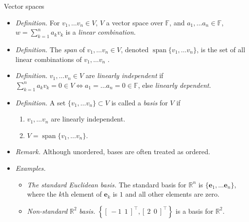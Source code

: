 \documentclass{beamer}
\numberwithin{equation}{section}
\begin{document}
\begin{frame}{Vector spaces}
    \begin{itemize}
        \item
        \textit{Definition.} For $ v_1, \ldots v_n \in V $, $ V $ a vector
        space over $ \mathbb{F} $, and $ a_1, \ldots a_n \in \mathbb{F} $,
        $ w = \sum_{k = 1}^na_kv_k $ is a \textit{linear combination}.

        \item
        \textit{Definition.} The \textit{span} of $ v_1, \ldots v_n \in V $,
        denoted $ \operatorname{span}\{v_1, \ldots v_n\} $, is the set of all
        linear combinations of $ v_1, \ldots v_n $ \cite{jacob_linalg}.

        \item
        \textit{Definition.} $ v_1, \ldots v_n \in V $ are \textit{linearly
        independent} if $ \sum_{k = 1}^na_kv_k = 0 \in V \Leftrightarrow
        a_1 = \ldots a_n = 0 \in \mathbb{F} $, else \textit{linearly
        dependent}.

        \item
        \textit{Definition.} A set $ \{v_1, \ldots v_n\} \subset V $ is called
        a \textit{basis} for $ V $ if \cite{jacob_linalg}
        \begin{enumerate}
            \item
            $ v_1, \ldots v_n $ are linearly independent.

            \item
            $ V = \operatorname{span}\{v_1, \ldots v_n\} $.
        \end{enumerate}

        \item
        \textit{Remark.} Although unordered, bases are often treated as
        ordered.

        \item
        \textit{Examples.}
        \begin{itemize}
            \item
            \textit{The standard Euclidean basis.} The standard basis for
            $ \mathbb{R}^n $ is $ \{\mathbf{e}_1, \ldots \mathbf{e}_n\} $,
            where the $ k $th element of $ \mathbf{e}_k $ is $ 1 $ and all
            other elements are zero.

            \item
            \textit{Non-standard} $ \mathbb{R}^2 $ \textit{basis.}
            $ \left\{[ \ -1 \ \ 1 \ ]^\top, [ \ 2 \ \ 0 \ ]^\top\right\} $ is
            a basis for $ \mathbb{R}^2 $.
        \end{itemize}
    \end{itemize}
\end{frame}
\end{document}
